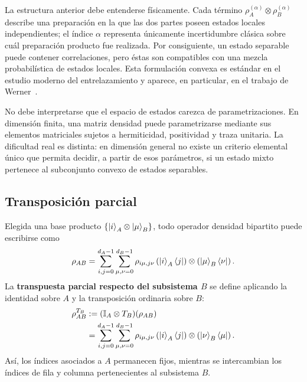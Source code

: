 \documentclass[12pt,a4paper]{article}
\theoremstyle{definition}
\theoremstyle{plain}
\theoremstyle{remark}
\newcommand{\I}{\mathbb{I}}
\begin{document}
La estructura anterior debe entenderse físicamente. Cada término $\rho_A^{(\alpha)}\otimes\rho_B^{(\alpha)}$ describe una preparación en la que las dos partes poseen estados locales independientes; el índice $\alpha$ representa únicamente incertidumbre clásica sobre cuál preparación producto fue realizada. Por consiguiente, un estado separable puede contener correlaciones, pero éstas son compatibles con una mezcla probabilística de estados locales. Esta formulación convexa es estándar en el estudio moderno del entrelazamiento y aparece, en particular, en el trabajo de Werner~\cite{Werner1989}.

No debe interpretarse que el espacio de estados carezca de parametrizaciones. En dimensión finita, una matriz densidad puede parametrizarse mediante sus elementos matriciales sujetos a hermiticidad, positividad y traza unitaria. La dificultad real es distinta: en dimensión general no existe un criterio elemental único que permita decidir, a partir de esos parámetros, si un estado mixto pertenece al subconjunto convexo de estados separables.

\subsection{Transposición parcial}

Elegida una base producto $\{\ket{i}_A\otimes\ket{\mu}_B\}$, todo operador densidad bipartito puede escribirse como
\begin{equation*}
    \rho_{AB}
    =\sum_{i,j=0}^{d_A-1}
     \sum_{\mu,\nu=0}^{d_B-1}
     \rho_{i\mu,j\nu}
     \left(\ket{i}_A\bra{j}\right)
     \otimes
     \left(\ket{\mu}_B\bra{\nu}\right).
\end{equation*}
La \textbf{transpuesta parcial respecto del subsistema $B$} se define aplicando la identidad sobre $A$ y la transposición ordinaria sobre $B$:
\begin{align*}
    \rho_{AB}^{T_B}
    &:=(\I_A\otimes T_B)(\rho_{AB})\\
    &=\sum_{i,j=0}^{d_A-1}
     \sum_{\mu,\nu=0}^{d_B-1}
     \rho_{i\mu,j\nu}
     \left(\ket{i}_A\bra{j}\right)
     \otimes
     \left(\ket{\nu}_B\bra{\mu}\right).
\end{align*}
Así, los índices asociados a $A$ permanecen fijos, mientras se intercambian los índices de fila y columna pertenecientes al subsistema $B$.
\end{document}
